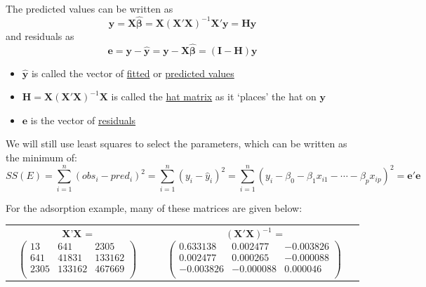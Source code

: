\newpage

The predicted values can be written as
$$\hat{\textbf{y}} = \textbf{X} \hat{\boldsymbol{\beta}} = \textbf{X} (\textbf{X}'\textbf{X})^{-1} \textbf{X}'\textbf{y} = \textbf{H} \textbf{y} $$
and residuals as
$$\textbf{e}  =  \textbf{y}-\hat{\textbf{y}}  =  \textbf{y} - \textbf{X}\hat{\boldsymbol{\beta}} =  (\textbf{I}-\textbf{H}) \textbf{y}$$

\begin{itemize}
\item $\hat{\textbf{y}}$ is called the vector of \underline{fitted} or \underline{predicted values}
\item $\textbf{H}=\textbf{X}(\textbf{X}'\textbf{X})^{-1}\textbf{X}$ is called the \underline{hat matrix} as it `places' the hat on $\textbf{y}$
\item $\textbf{e}$ is the vector of \underline{residuals}
\end{itemize}

We will still use least squares to select the parameters, which can be written as the minimum of:
$$SS(E) = \sum_{i=1}^{n}(obs_i-pred_i)^2=\sum_{i=1}^n(y_i-\hat{y}_i)^2=\sum_{i=1}^n (y_i - \beta_0 - \beta_1 x_{i1} - \cdots - \beta_p x_{ip})^2=\textbf{e}'\textbf{e}$$

For the adsorption example, many of these matrices are given below:
\begin{center}
\begin{tabular}{cc}
\textbf{X}'\textbf{X} = $\left(\begin{array}{ccc} 13&641&2305\\ 641&41831 & 133162\\ 2305&133162 &467669\\\end{array}\right)$ &
$(\textbf{X}'\textbf{X})^{-1}$ = $\left(\begin{array}{ccc} 0.633138 &0.002477&-0.003826\\ 0.002477 & 0.000265 & -0.000088\\ -0.003826 &-0.000088 &0.000046 \\\end{array}\right)$ 
\end{tabular}
\end{center}

